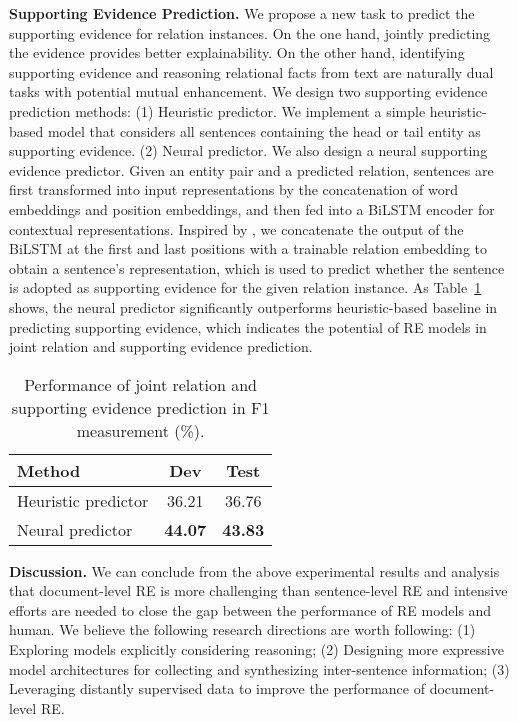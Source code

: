 \documentclass[11pt,a4paper]{article}
\begin{document}
\smallskip
\noindent
\textbf{Supporting Evidence Prediction.}
We propose a new task to predict the supporting evidence for relation instances. On the one hand, jointly predicting the evidence provides better explainability. On the other hand, identifying supporting evidence and reasoning relational facts from text are naturally dual tasks with potential mutual enhancement. We design two supporting evidence prediction methods: (1) Heuristic predictor. We implement a simple heuristic-based model that considers all sentences containing the head or tail entity as supporting evidence. (2) Neural predictor. We also design a neural supporting evidence predictor. Given an entity pair and a predicted relation, sentences are first transformed into input representations by the concatenation of word embeddings and position embeddings, and then fed into a BiLSTM encoder for contextual representations. Inspired by \citet{DBLP:conf/emnlp/Yang0ZBCSM18}, we concatenate the output of the BiLSTM at the first and last positions with a trainable relation embedding to obtain a sentence's representation, which is used to predict whether the sentence is adopted as supporting evidence for the given relation instance. As Table~\ref{tab:7} shows, the neural predictor significantly outperforms heuristic-based baseline in predicting supporting evidence, which indicates the potential of RE models in joint relation and supporting evidence prediction. 







\begin{table}[htbp]
\begin{center}
\small
\begin{tabular}{lcc}
\toprule
Method & Dev & Test \\
\midrule
Heuristic predictor & 36.21 & 36.76\\
Neural predictor & \textbf{44.07} & \textbf{43.83}\\
\bottomrule
\end{tabular}
\end{center}
\caption{Performance of joint relation and supporting evidence prediction in F1 measurement (\%).}
\label{tab:7}
\end{table}



\smallskip
\noindent
\textbf{Discussion.}
We can conclude from the above experimental results and analysis that document-level RE is more challenging than sentence-level RE and intensive efforts are needed to close the gap between the performance of RE models and human. We believe the following research directions are worth following: (1) Exploring models explicitly considering reasoning; (2) Designing more expressive model architectures for collecting and synthesizing inter-sentence information; (3) Leveraging distantly supervised data to improve the performance of document-level RE.
\end{document}
